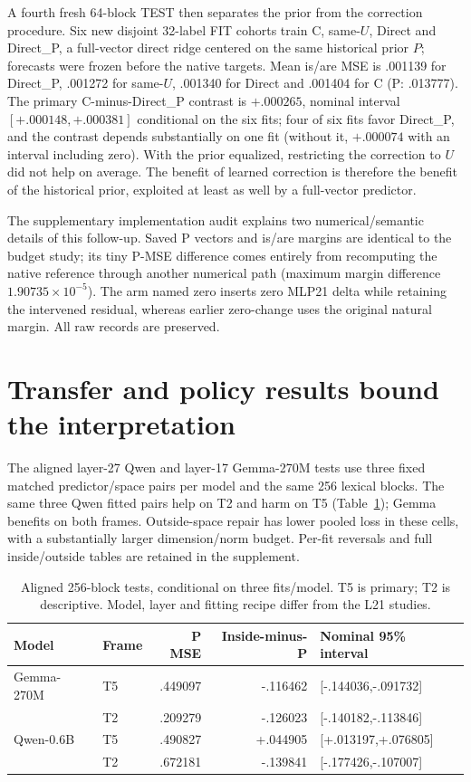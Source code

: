 \documentclass[11pt]{article}
\begin{document}
A fourth fresh 64-block TEST then separates the prior from the correction procedure. Six new disjoint 32-label FIT cohorts train C, same-$U$, Direct and Direct\_P, a full-vector direct ridge centered on the same historical prior $P$; forecasts were frozen before the native targets. Mean is/are MSE is .001139 for Direct\_P, .001272 for same-$U$, .001340 for Direct and .001404 for C (P: .013777). The primary C-minus-Direct\_P contrast is $+.000265$, nominal interval $[+.000148,+.000381]$ conditional on the six fits; four of six fits favor Direct\_P, and the contrast depends substantially on one fit (without it, $+.000074$ with an interval including zero). With the prior equalized, restricting the correction to $U$ did not help on average. The benefit of learned correction is therefore the benefit of the historical prior, exploited at least as well by a full-vector predictor.

The supplementary implementation audit explains two numerical/semantic details of this follow-up. Saved P vectors and is/are margins are identical to the budget study; its tiny P-MSE difference comes entirely from recomputing the native reference through another numerical path (maximum margin difference $1.90735\times10^{-5}$). The arm named zero inserts zero MLP21 delta while retaining the intervened residual, whereas earlier zero-change uses the original natural margin. All raw records are preserved.

\section{Transfer and policy results bound the interpretation}
The aligned layer-27 Qwen and layer-17 Gemma-270M tests use three fixed matched predictor/space pairs per model and the same 256 lexical blocks. The same three Qwen fitted pairs help on T2 and harm on T5 (Table~\ref{tab:aligned}); Gemma benefits on both frames. Outside-space repair has lower pooled loss in these cells, with a substantially larger dimension/norm budget. Per-fit reversals and full inside/outside tables are retained in the supplement.

\begin{table}[ht]\centering\small
\begin{tabular}{llrrl}\toprule Model & Frame & P MSE & Inside-minus-P & Nominal 95\% interval\\\midrule
Gemma-270M & T5 & .449097 & -.116462 & [-.144036,-.091732]\\
 & T2 & .209279 & -.126023 & [-.140182,-.113846]\\
Qwen-0.6B & T5 & .490827 & +.044905 & [+.013197,+.076805]\\
 & T2 & .672181 & -.139841 & [-.177426,-.107007]\\\bottomrule\end{tabular}
\caption{Aligned 256-block tests, conditional on three fits/model. T5 is primary; T2 is descriptive. Model, layer and fitting recipe differ from the L21 studies.}\label{tab:aligned}
\end{table}
\end{document}
